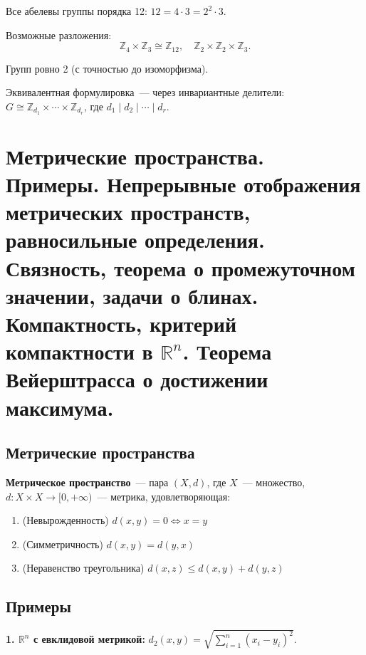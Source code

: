 \documentclass[12pt]{article}
\begin{document}
	\begin{example}
		Все абелевы группы порядка 12: $12 = 4 \cdot 3 = 2^2 \cdot 3$.
		
		Возможные разложения:
		\[\mathbb{Z}_4 \times \mathbb{Z}_3 \cong \mathbb{Z}_{12}, \quad \mathbb{Z}_2 \times \mathbb{Z}_2 \times \mathbb{Z}_3.\]
		
		Групп ровно 2 (с точностью до изоморфизма).
	\end{example}
	
	\begin{note}
		Эквивалентная формулировка~--- через инвариантные делители: $G \cong \mathbb{Z}_{d_1} \times \cdots \times \mathbb{Z}_{d_r}$, где $d_1 \mid d_2 \mid \cdots \mid d_r$.
	\end{note}
	
	\newpage
	
	\section{Метрические пространства. Примеры. Непрерывные отображения метрических пространств, равносильные определения. Связность, теорема о промежуточном значении, задачи о блинах. Компактность, критерий компактности в $\mathbb{R}^n$. Теорема Вейерштрасса о достижении максимума.}
	
	\subsection{Метрические пространства}
	
	\begin{definition}
		\textbf{Метрическое пространство}~--- пара $(X, d)$, где $X$~--- множество, $d: X \times X \to [0, +\infty)$~--- метрика, удовлетворяющая:
		\begin{enumerate}
			\item (Невырожденность) $d(x, y) = 0 \Leftrightarrow x = y$
			\item (Симметричность) $d(x, y) = d(y, x)$
			\item (Неравенство треугольника) $d(x, z) \leqslant d(x, y) + d(y, z)$
		\end{enumerate}
	\end{definition}
	
	\subsection{Примеры}
	
	\textbf{1. $\mathbb{R}^n$ с евклидовой метрикой:} $d_2(x, y) = \sqrt{\sum_{i=1}^{n} (x_i - y_i)^2}$.
	
\end{document}
